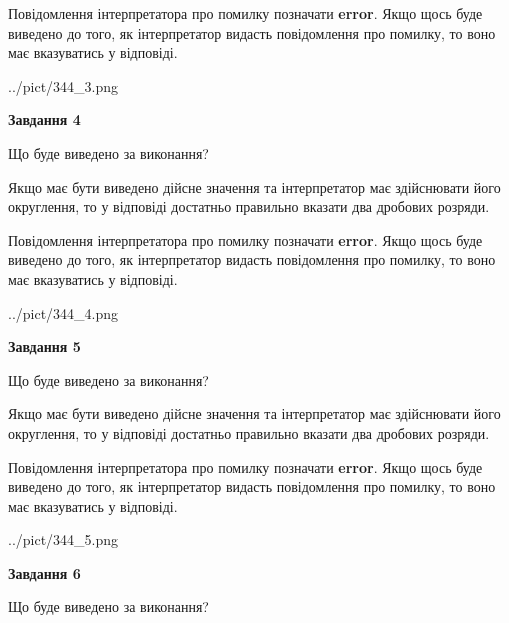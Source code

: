 \documentclass[12pt, ukrainian]{article}
\begin{document}
{\begin {Large}
Повідомлення інтерпретатора про помилку позначати \textbf{error}.
Якщо щось буде виведено до того, як інтерпретатор видасть повідомлення про помилку, 
то воно має вказуватись у відповіді. \par

\begin{center}
	{../pict/344_3.png}
\end{center}
\newpage

{\begin {center}\textbf{Завдання 4}\end {center}}\par
Що буде виведено за виконання? \par

Якщо має бути виведено дійсне значення та інтерпретатор має здійснювати його округлення, 
то у відповіді достатньо правильно вказати два дробових розряди.

Повідомлення інтерпретатора про помилку позначати \textbf{error}.
Якщо щось буде виведено до того, як інтерпретатор видасть повідомлення про помилку, 
то воно має вказуватись у відповіді. \par

\begin{center}
	{../pict/344_4.png}
\end{center}
\newpage

{\begin {center}\textbf{Завдання 5}\end {center}}\par
Що буде виведено за виконання? \par

Якщо має бути виведено дійсне значення та інтерпретатор має здійснювати його округлення, 
то у відповіді достатньо правильно вказати два дробових розряди.

Повідомлення інтерпретатора про помилку позначати \textbf{error}.
Якщо щось буде виведено до того, як інтерпретатор видасть повідомлення про помилку, 
то воно має вказуватись у відповіді. \par

\begin{center}
	{../pict/344_5.png}
\end{center}
\newpage

{\begin {center}\textbf{Завдання 6}\end {center}}\par
Що буде виведено за виконання? \par


\end{Large}}
\end{document}
